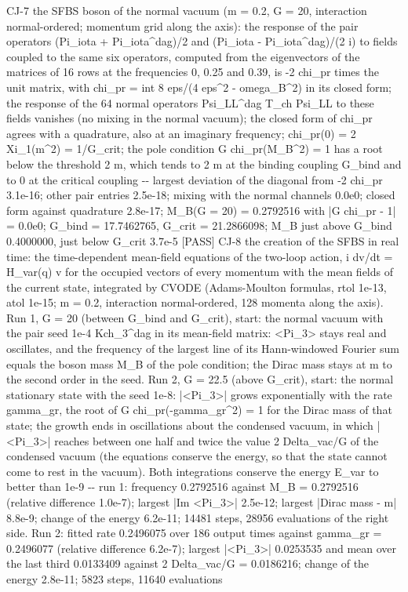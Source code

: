 \documentclass[
  10pt,
]{article}
\newenvironment{Shaded}{}{}
\newcommand{\NormalTok}[1]{#1}
\begin{document}
\begin{Shaded}
\begin{Highlighting}[]
\NormalTok{[PASS] CJ{-}7  the SFBS boson of the normal vacuum (m = 0.2, G = 20, interaction normal{-}ordered; momentum grid along the axis): the response of the pair operators (Pi\_iota + Pi\_iota\^{}dag)/2 and (Pi\_iota {-} Pi\_iota\^{}dag)/(2 i) to fields coupled to the same six operators, computed from the eigenvectors of the matrices of 16 rows at the frequencies 0, 0.25 and 0.39, is {-}2 chi\_pr times the unit matrix, with chi\_pr = int 8 eps/(4 eps\^{}2 {-} omega\_B\^{}2) in its closed form; the response of the 64 normal operators Psi\_LL\^{}dag T\_ch Psi\_LL to these fields vanishes (no mixing in the normal vacuum); the closed form of chi\_pr agrees with a quadrature, also at an imaginary frequency; chi\_pr(0) = 2 Xi\_1(m\^{}2) = 1/G\_crit; the pole condition G chi\_pr(M\_B\^{}2) = 1 has a root below the threshold 2 m, which tends to 2 m at the binding coupling G\_bind and to 0 at the critical coupling  {-}{-} largest deviation of the diagonal from {-}2 chi\_pr 3.1e{-}16; other pair entries 2.5e{-}18; mixing with the normal channels 0.0e0; closed form against quadrature 2.8e{-}17; M\_B(G = 20) = 0.2792516 with |G chi\_pr {-} 1| = 0.0e0; G\_bind = 17.7462765, G\_crit = 21.2866098; M\_B just above G\_bind 0.4000000, just below G\_crit 3.7e{-}5}
\NormalTok{[PASS] CJ{-}8  the creation of the SFBS in real time: the time{-}dependent mean{-}field equations of the two{-}loop action, i dv/dt = H\_var(q) v for the occupied vectors of every momentum with the mean fields of the current state, integrated by CVODE (Adams{-}Moulton formulas, rtol 1e{-}13, atol 1e{-}15; m = 0.2, interaction normal{-}ordered, 128 momenta along the axis). Run 1, G = 20 (between G\_bind and G\_crit), start: the normal vacuum with the pair seed 1e{-}4 Kch\_3\^{}dag in its mean{-}field matrix: \textless{}Pi\_3\textgreater{} stays real and oscillates, and the frequency of the largest line of its Hann{-}windowed Fourier sum equals the boson mass M\_B of the pole condition; the Dirac mass stays at m to the second order in the seed. Run 2, G = 22.5 (above G\_crit), start: the normal stationary state with the seed 1e{-}8: |\textless{}Pi\_3\textgreater{}| grows exponentially with the rate gamma\_gr, the root of G chi\_pr({-}gamma\_gr\^{}2) = 1 for the Dirac mass of that state; the growth ends in oscillations about the condensed vacuum, in which |\textless{}Pi\_3\textgreater{}| reaches between one half and twice the value 2 Delta\_vac/G of the condensed vacuum (the equations conserve the energy, so that the state cannot come to rest in the vacuum). Both integrations conserve the energy E\_var to better than 1e{-}9  {-}{-} run 1: frequency 0.2792516 against M\_B = 0.2792516 (relative difference 1.0e{-}7); largest |Im \textless{}Pi\_3\textgreater{}| 2.5e{-}12; largest |Dirac mass {-} m| 8.8e{-}9; change of the energy 6.2e{-}11; 14481 steps, 28956 evaluations of the right side. Run 2: fitted rate 0.2496075 over 186 output times against gamma\_gr = 0.2496077 (relative difference 6.2e{-}7); largest |\textless{}Pi\_3\textgreater{}| 0.0253535 and mean over the last third 0.0133409 against 2 Delta\_vac/G = 0.0186216; change of the energy 2.8e{-}11; 5823 steps, 11640 evaluations}

\end{Highlighting}
\end{Shaded}
\end{document}

